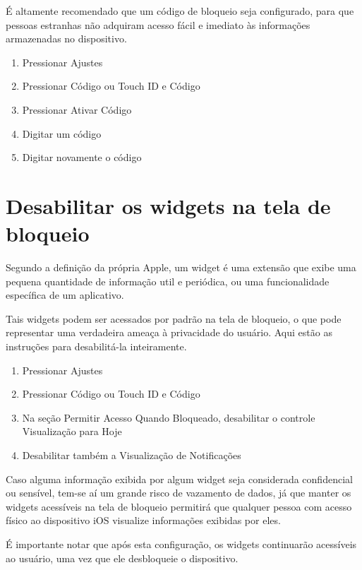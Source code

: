 \'E altamente recomendado que um c\'odigo de bloqueio seja configurado, para que pessoas estranhas n\~ao adquiram acesso f\'acil e imediato \`as informa\c c\~oes armazenadas no dispositivo. 

\begin{enumerate}
\item Pressionar Ajustes
\item Pressionar C\'odigo ou Touch ID e C\'odigo
\item Pressionar Ativar C\'odigo
\item Digitar um c\'odigo
\item Digitar novamente o c\'odigo
\end{enumerate}

\section{Desabilitar os widgets na tela de bloqueio}

Segundo a defini\c c\~ao da pr\'opria Apple, um widget \'e uma extens\~ao que exibe uma pequena quantidade de informa\c c\~ao util e peri\'odica, ou uma funcionalidade espec\'ifica de um aplicativo. 

Tais widgets podem ser acessados por padr\~ao na tela de bloqueio, o que pode representar uma verdadeira amea\c ca \`a privacidade do usu\'ario. 
Aqui est\~ao as instru\c c\~oes para desabilit\'a-la inteiramente.

\begin{enumerate}
\item Pressionar Ajustes
\item Pressionar C\'odigo ou Touch ID e C\'odigo
\item Na se\c c\~ao Permitir Acesso Quando Bloqueado, desabilitar o controle Visualiza\c c\~ao para Hoje
\item Desabilitar tamb\'em a Visualiza\c c\~ao de Notifica\c c\~oes
\end{enumerate}

Caso alguma informa\c c\~ao exibida por algum widget seja considerada confidencial ou sens\'ivel, tem-se a\'i um grande risco de vazamento de dados, j\'a que manter os widgets acess\'iveis na tela de bloqueio permitir\'a que qualquer pessoa com acesso f\'isico ao dispositivo iOS visualize informa\c c\~oes exibidas por eles.

\'E importante notar que ap\'os esta configura\c c\~ao, os widgets continuar\~ao acess\'iveis ao usu\'ario, uma vez que ele desbloqueie o dispositivo.

